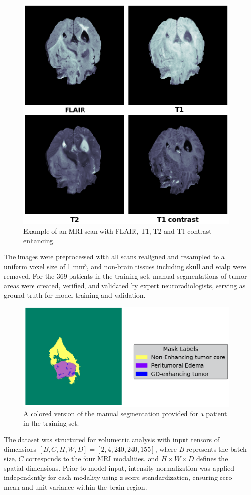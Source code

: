 \documentclass[10pt,twocolumn,letterpaper]{article}
\begin{document}
\begin{figure}[H]
\centering
\includegraphics[width=0.55\linewidth]{img/example_MRI.png}
\caption{Example of an MRI scan with FLAIR, T1, T2 and T1 contrast-enhancing.}
\end{figure}

The images were preprocessed with all scans realigned and resampled to a uniform voxel size of 1 mm³, and non-brain tissues including skull and scalp were removed. For the 369 patients in the training set, manual segmentations of tumor areas were created, verified, and validated by expert neuroradiologists, serving as ground truth for model training and validation.

\begin{figure}[H]
\centering
\includegraphics[width=0.65\linewidth]{img/groundtruth_example.png}
\caption{A colored version of the manual segmentation provided for a patient in the training set.}
\end{figure}

The dataset was structured for volumetric analysis with input tensors of dimensions $[B, C, H, W, D] = [2, 4, 240, 240, 155]$, where $B$ represents the batch size, $C$ corresponds to the four MRI modalities, and $H \times W \times D$ defines the spatial dimensions. Prior to model input, intensity normalization was applied independently for each modality using z-score standardization, ensuring zero mean and unit variance within the brain region.
\end{document}
